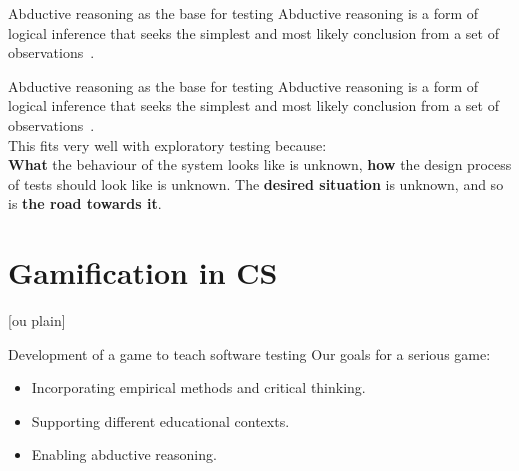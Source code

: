 \documentclass[aspectratio=169]{beamer}
\begin{document}
\begin{frame}{Abductive reasoning as the base for testing}
    Abductive reasoning is a form of logical inference that seeks the simplest and most likely conclusion from a set of observations~\cite{ContributorstoWikimediaprojects2024Feb}.
\end{frame}

\begin{frame}{Abductive reasoning as the base for testing}
    Abductive reasoning is a form of logical inference that seeks the simplest and most likely conclusion from a set of observations~\cite{ContributorstoWikimediaprojects2024Feb}.\\
    \vspace{0.5cm}
    This fits very well with exploratory testing because:\\
    \vspace{0.5cm}
    \textbf{What} the behaviour of the system looks like is unknown, \textbf{how} the design process of tests should look like is unknown. The \textbf{desired situation} is unknown, and so is \textbf{the road towards it}.
\end{frame}



\section{Gamification in CS}

[ou plain]
\begin{frame}{Development of a game to teach software testing}
    Our goals for a serious game:
    \begin{itemize}
        \item Incorporating empirical methods and critical thinking.
        \item Supporting different educational contexts.
        \item Enabling abductive reasoning.
    \end{itemize}
\end{frame}
\end{document}
